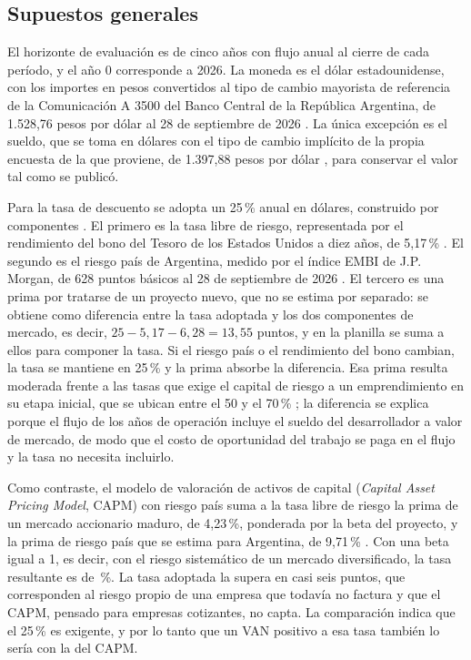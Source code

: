 \subsection{Supuestos generales}

El horizonte de evaluación es de cinco años con flujo anual al cierre de cada período, y el año 0 corresponde a 2026. La moneda es el dólar estadounidense, con los importes en pesos convertidos al tipo de cambio mayorista de referencia de la Comunicación A 3500 del Banco Central de la República Argentina, de 1.528,76 pesos por dólar al 28 de septiembre de 2026 \parencite{BCRA2026}. La única excepción es el sueldo, que se toma en dólares con el tipo de cambio implícito de la propia encuesta de la que proviene, de 1.397,88 pesos por dólar \parencite{Sysarmy2026}, para conservar el valor tal como se publicó.

Para la tasa de descuento se adopta un 25\,\% anual en dólares, construido por componentes \parencite{SapagEtAl2014}. El primero es la tasa libre de riesgo, representada por el rendimiento del bono del Tesoro de los Estados Unidos a diez años, de 5,17\,\% \parencite{FederalReserve2026}. El segundo es el riesgo país de Argentina, medido por el índice EMBI de J.P. Morgan, de 628 puntos básicos al 28 de septiembre de 2026 \parencite{RavaBursatil2026}. El tercero es una prima por tratarse de un proyecto nuevo, que no se estima por separado: se obtiene como diferencia entre la tasa adoptada y los dos componentes de mercado, es decir, $25 - 5{,}17 - 6{,}28 = 13{,}55$ puntos, y en la planilla se suma a ellos para componer la tasa. Si el riesgo país o el rendimiento del bono cambian, la tasa se mantiene en 25\,\% y la prima absorbe la diferencia. Esa prima resulta moderada frente a las tasas que exige el capital de riesgo a un emprendimiento en su etapa inicial, que se ubican entre el 50 y el 70\,\% \parencite{Damodaran2010}; la diferencia se explica porque el flujo de los años de operación incluye el sueldo del desarrollador a valor de mercado, de modo que el costo de oportunidad del trabajo se paga en el flujo y la tasa no necesita incluirlo.

Como contraste, el modelo de valoración de activos de capital (\textit{Capital Asset Pricing Model}, CAPM) con riesgo país suma a la tasa libre de riesgo la prima de un mercado accionario maduro, de 4,23\,\%, ponderada por la beta del proyecto, y la prima de riesgo país que se estima para Argentina, de 9,71\,\% \parencite{Damodaran2026}. Con una beta igual a 1, es decir, con el riesgo sistemático de un mercado diversificado, la tasa resultante es de \finTasaCapm\,\%. La tasa adoptada la supera en casi seis puntos, que corresponden al riesgo propio de una empresa que todavía no factura y que el CAPM, pensado para empresas cotizantes, no capta. La comparación indica que el 25\,\% es exigente, y por lo tanto que un VAN positivo a esa tasa también lo sería con la del CAPM.

